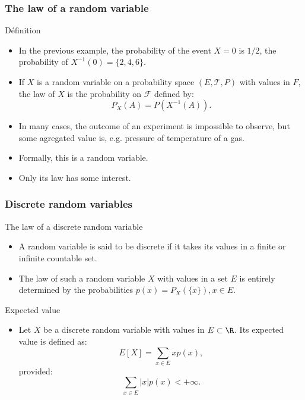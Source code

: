 \begin{frame}
    \frametitle{The law of a random variable}
\begin{block}{Définition}
    \begin{itemize}
        \item<+-> In the previous example,  
        the probability of the event $X=0$ is $1/2$, the probability of  
        $X^{-1}\left( 0 \right)=\{2,4,6\}.$
        \item<+-> If $X$ is a random variable on a probability space $\left( E,\mathcal{T},P \right)$
        with values in $F$, the law of $X$ is the probability on $\mathcal{F}$ defined by:
        \begin{equation}
            P_X \left( A \right) = P \left( X^{-1}(A) \right).
        \end{equation}
    \item<+-> In many cases, the outcome of an experiment is impossible to observe, but 
    some agregated value is, e.g. pressure of temperature of a gas.
    \item<+-> Formally, this is a random variable.
    \item<+-> Only its law has some interest.
   \end{itemize} 
\end{block}    
\end{frame}
\begin{frame}
    \frametitle{Discrete random variables}
\begin{block}{The law of a discrete random variable}
    \begin{itemize}
        \item<+-> A random variable is said to be discrete if it takes its 
        values in a finite or infinite countable set.
        \item<+-> The law of such a random variable $X$ with values in a set $E$ is entirely determined
        by the probabilities $p(x) = P_X\left( \{x\} \right), x \in E.$
    \end{itemize}
\end{block}
\begin{block}{Expected value}
    \begin{itemize}
        \item<+-> Let $X$ be a discrete random variable with values in $E\subset \R$. 
        Its expected value is defined as:
        \begin{equation}
            E\left[ X \right] = \sum_{x \in E} x p(x),
        \end{equation}
        provided:
        \begin{equation}
            \sum_{x \in E} \lvert x \rvert p(x)< +\infty.
         \end{equation}
    \end{itemize}
\end{block}
\end{frame}
